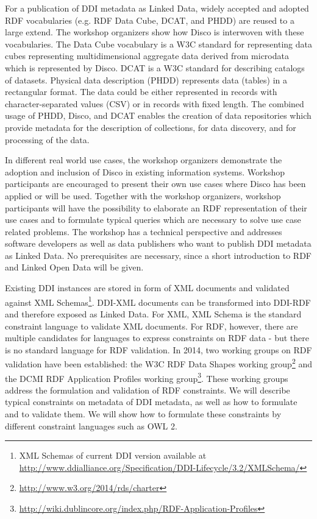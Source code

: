 \documentclass{llncs}
\begin{document}
For a publication of DDI metadata as Linked Data, widely accepted and adopted RDF vocabularies (e.g. RDF Data Cube, DCAT, and PHDD) are reused to a large extend. The workshop organizers show how Disco is interwoven with these vocabularies. The Data Cube vocabulary is a W3C standard for representing data cubes representing multidimensional aggregate data derived from microdata which is represented by Disco. DCAT is a W3C standard for describing catalogs of datasets. Physical data description (PHDD) represents data (tables) in a rectangular format. The data could be either represented in records with character-separated values (CSV) or in records with fixed length. The combined usage of PHDD, Disco, and DCAT enables the creation of data repositories which provide metadata for the description of collections, for data discovery, and for processing of the data.
 
In different real world use cases, the workshop organizers demonstrate the adoption and inclusion of Disco in existing information systems. Workshop participants are encouraged to present their own use cases where Disco has been applied or will be used. Together with the workshop organizers, workshop participants will have the possibility to elaborate an RDF representation of their use cases and to formulate typical queries which are necessary to solve use case related problems.
The workshop has a technical perspective and addresses software developers as well as data publishers who want to publish DDI metadata as Linked Data. No prerequisites are necessary, since a short introduction to RDF and Linked Open Data will be given.

Existing DDI instances are stored in form of XML documents and validated against XML Schemas\footnote{XML Schemas of current DDI version available at \url{http://www.ddialliance.org/Specification/DDI-Lifecycle/3.2/XMLSchema/}}.
DDI-XML documents can be transformed into DDI-RDF and therefore exposed as Linked Data.
For XML, XML Schema is the standard constraint language to validate XML documents.
For RDF, however, there are multiple candidates for languages to express constraints on RDF data - but there is no standard language for RDF validation.
In 2014, two working groups on RDF validation have been established: the W3C RDF Data Shapes working group\footnote{\url{http://www.w3.org/2014/rds/charter}} and the DCMI RDF Application Profiles working group\footnote{\url{http://wiki.dublincore.org/index.php/RDF-Application-Profiles}}.
These working groups address the formulation and validation of RDF constraints.
We will describe typical constraints on metadata of DDI metadata, as well as how to formulate and to validate them.
We will show how to formulate these constraints by different constraint languages such as OWL 2.
\end{document}
